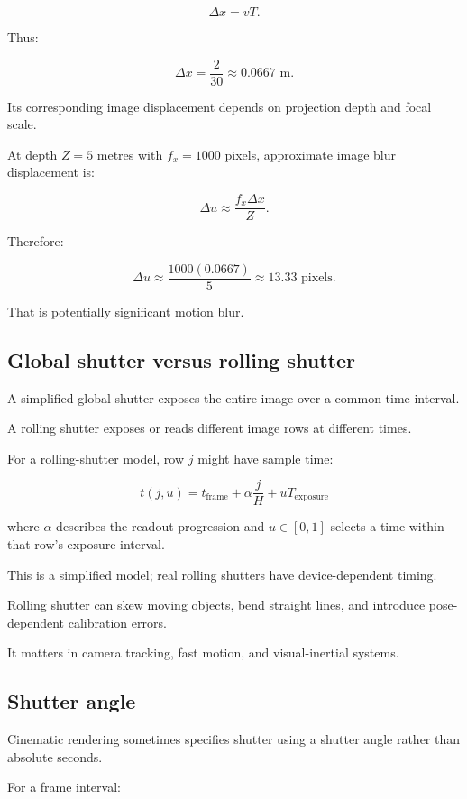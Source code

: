 \[ \Delta x=vT. \]

Thus:

\[ \boxed{ \Delta x=\frac2{30}\approx0.0667\text{ m}. } \]

Its corresponding image displacement depends on projection depth and focal scale.

At depth \(Z=5\) metres with \(f_x=1000\) pixels, approximate image blur displacement is:

\[ \Delta u\approx\frac{f_x\Delta x}{Z}. \]

Therefore:

\[ \Delta u\approx \frac{1000(0.0667)}5 \approx\boxed{13.33\text{ pixels}}. \]

That is potentially significant motion blur.

\subsection{Global shutter versus rolling shutter}\label{02-foundations-ii-ch036-global-shutter-versus-rolling-shutter}

A simplified global shutter exposes the entire image over a common time interval.

A rolling shutter exposes or reads different image rows at different times.

For a rolling-shutter model, row \(j\) might have sample time:

\[ \boxed{ t(j,u)= t_{\mathrm{frame}} +\alpha\frac jH +uT_{\mathrm{exposure}} } \]

where \(\alpha\) describes the readout progression and \(u\in[0,1]\) selects a time within that row's exposure interval.

This is a simplified model; real rolling shutters have device-dependent timing.

Rolling shutter can skew moving objects, bend straight lines, and introduce pose-dependent calibration errors.

It matters in camera tracking, fast motion, and visual-inertial systems.

\subsection{Shutter angle}\label{02-foundations-ii-ch036-shutter-angle}

Cinematic rendering sometimes specifies shutter using a shutter angle rather than absolute seconds.

For a frame interval:

